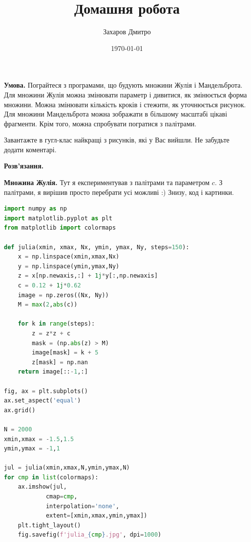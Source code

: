 \documentclass[oneside,solution]{tmpl}
\title{Домашня робота}
\author{Захаров Дмитро}
\date{\today}
\begin{document}
\maketitle


\problem{}

\hspace{20px}\textbf{Умова.} Пограйтеся з програмами, що будують множини Жулія і Мандельброта. Для множини Жулія можна змінювати параметр і дивитися, як змінюється форма множини. Можна змінювати кількість кроків і стежити, як уточнюється рисунок. Для множини Мандельброта можна зображати в більшому масштабі цікаві фрагменти. Крім того, можна спробувати погратися з палітрами.

Завантажте в гугл-клас найкращі з рисунків, які у Вас вийшли. Не забудьте додати коментарі.

\textbf{Розв'язання.} 

\textbf{Множина Жулія.} Тут я експериментував з палітрами та параметром $c$. З палітрами, я вирішив просто перебрати усі можливі :) Знизу, код і картинки.

\begin{lstlisting}[language=Python]
import numpy as np
import matplotlib.pyplot as plt
from matplotlib import colormaps

def julia(xmin, xmax, Nx, ymin, ymax, Ny, steps=150):
    x = np.linspace(xmin,xmax,Nx)
    y = np.linspace(ymin,ymax,Ny)
    z = x[np.newaxis,:] + 1j*y[:,np.newaxis]
    c = 0.12 + 1j*0.62
    image = np.zeros((Nx, Ny)) 
    M = max(2,abs(c))
    
    for k in range(steps):
        z = z*z + c
        mask = (np.abs(z) > M) 
        image[mask] = k + 5
        z[mask] = np.nan
    return image[::-1,:] 
      
fig, ax = plt.subplots()
ax.set_aspect('equal')
ax.grid()

N = 2000
xmin,xmax = -1.5,1.5
ymin,ymax = -1,1

jul = julia(xmin,xmax,N,ymin,ymax,N)
for cmp in list(colormaps):
    ax.imshow(jul, 
            cmap=cmp, 
            interpolation='none',
            extent=[xmin,xmax,ymin,ymax])
    plt.tight_layout()
    fig.savefig(f'julia_{cmp}.jpg', dpi=1000)
\end{lstlisting}
\end{document}
